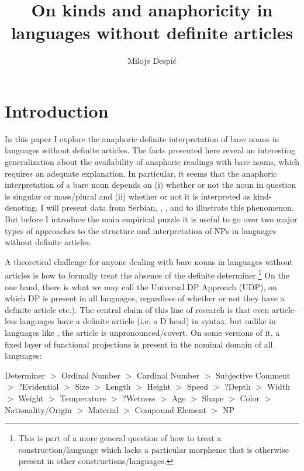 \documentclass[output=paper,
modfonts
]{langscibook}
\title{On kinds and anaphoricity in languages without definite articles}
\author{%
	Miloje Despi\'c\affiliation{Cornell University}
}
\begin{document}
	\maketitle
	\section{Introduction}
	In this paper I explore the anaphoric definite interpretation of bare nouns in languages without definite articles. The facts presented here reveal an interesting generalization about the availability of anaphoric readings with bare nouns, which requires an adequate explanation. In particular, it seems that the anaphoric interpretation of a bare noun depends on (i) whether or not the noun in question is singular or mass/plural and (ii) whether or not it is interpreted as kind-denoting. I will present data from Serbian, , ,  and  to illustrate this phenomenon. But before I introduce the main empirical puzzle it is useful to go over two major types of approaches to the structure and interpretation of NPs in languages without definite articles.
	
	A theoretical challenge for anyone dealing with bare nouns in languages without articles is how to formally treat the absence of the definite determiner.\footnote{This is part of a more general question of how to treat a construction/language which lacks a particular morpheme that is otherwise present in other constructions/languages.}  On the one hand, there is what we may call the Universal DP Approach (UDP), on which DP is present in all languages, regardless of whether or not they have a definite article \citep[e.g.][]{Longobardi1994,Cinque1994,Scott2002,Pereltsvaig2007} etc.). The central claim of this line of research is that even article-less languages have a definite article (i.e. a D head) in syntax, but unlike in languages like , the article is unpronounced/covert. On some versions of it, a fixed layer of functional projections is present in the nominal domain of all languages:
	
	\ea \label{ex:despic:1} 
	{Determiner} $>$ {Ordinal Number} $>$ {Cardinal Number} $>$ {Subjective Comment} $>$ {?Evidential} $>$ {Size} $>$ {Length} $>$ {Height} $>$ {Speed} $>$ {?Depth} $>$ {Width} $>$ {Weight} $>$ {Temperature} $>$ {?Wetness} $>$ {Age} $>$ {Shape} $>$ {Color} $>$ {Nationality/Origin} $>$ {Material} $>$ {Compound Element} $>$ {NP}	\citep[114]{Scott2002} 
	\z
	
\end{document}
